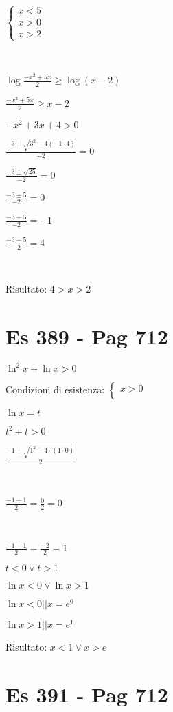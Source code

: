 \documentclass[11pt]{article}
\begin{document}
$ 
\left \{ \begin{array}{rl}
    x < 5 \\
    x > 0 \\
    x > 2
    \end{array}
    \right.
$


\,

$ \log{\frac{-x^2 + 5x}{2}} \geq \log(x-2) $

$ \frac{-x^2 + 5x}{2} \geq x-2 $

$ -x^2 + 3x + 4 > 0 $

$ \frac{-3 \pm \sqrt{3 ^ 2 - 4(-1 \cdot 4)}}{-2} = 0$

$ \frac{-3 \pm \sqrt{25}}{-2} = 0 $

$ \frac{-3 \pm 5}{-2} = 0 $

$ \frac{-3 + 5}{-2} = -1 $

$ \frac{-3 - 5}{-2} = 4 $

\,

Risultato: $ 4 > x > 2 $

\section{ Es 389 - Pag 712 }

$ \ln^2{x} + \ln{x} > 0 $

Condizioni di esistenza:
$ 
\left \{ \begin{array}{rl}
    x > 0 \\
    \end{array}
    \right.
$

$ \ln{x} = t $

$ t^2 + t > 0 $

$ \frac{-1 \pm \sqrt{1^2 - 4 \cdot (1 \cdot 0)}}{2} $

\,

$ \frac{-1 + 1}{2} = \frac{0}{2} = 0 $

\,

$ \frac{-1 - 1}{2} = \frac{-2}{2} = 1 $

$ t < 0 \vee t > 1 $

$ \ln{x} < 0 \vee \ln{x} > 1 $

$ \ln{x} < 0 || x = e^0 $

$ \ln{x} > 1 || x = e^1 $

Risultato: $ x < 1 \vee x > e $

\section{ Es 391 - Pag 712 }
\end{document}
